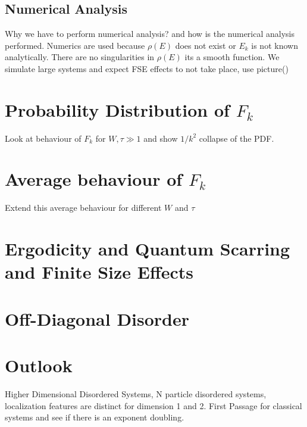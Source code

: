 \documentclass[12pt]{article}
\begin{document}
\subsection{Numerical Analysis}
Why we have to perform numerical analysis? and how is the numerical analysis performed.
Numerics are used because $\rho(E)$ does not exist or $E_k$ is not known analytically. There are no singularities in $\rho(E)$ its a smooth function. 
We simulate large systems and expect FSE effects to not take place, use picture()\\
\section{Probability Distribution of $F_k$}
Look at behaviour of $F_k$ for $W,\tau\gg1$ and show $1/k^2$ collapse of the PDF.
\section{Average behaviour of $F_k$}
Extend this average behaviour for different $W$ and $\tau$
\section{Ergodicity and Quantum Scarring and Finite Size Effects}
\section{Off-Diagonal Disorder}
\section{Outlook}
Higher Dimensional Disordered Systems, N particle disordered systems, localization features are distinct for dimension 1 and 2. First Passage for classical systems and see if there is an exponent doubling.
\end{document}

